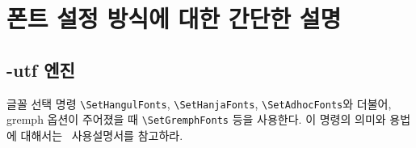 \documentclass[
	12pt,
	a4paper,
	kosection,
	footnote,
	nobookmarks,
	microtype,
]{oblivoir}
\def\myREF#1#2{\ref{#1}}
\def\myLabel#1#2{\label{#1}}
\def\myREF#1#2{\ref{#2}}
\def\myLabel#1#2{\label{#2}}
\newcommand\xobclass{x\-ob\-liv\-oir\oblivoirallowbreak}
\newcommand\obclass{ob\-liv\-oir\oblivoirallowbreak}
\begin{document}

\section{폰트 설정 방식에 대한 간단한 설명}\myLabel{sec:font}{sec:폰트}

\subsection{\koTeX-utf 엔진}

글꼴 선택 명령 \verb|\SetHangulFonts|, \verb|\SetHanjaFonts|, \verb|\SetAdhocFonts|와 더불어,
gremph 옵션이 주어졌을 때 \verb|\SetGremphFonts| 등을 사용한다.
이 명령의 의미와 용법에 대해서는 \koTeX\ 사용설명서를 참고하라.
\end{document}

